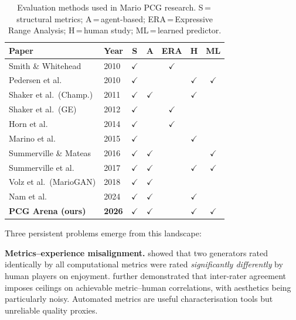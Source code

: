 \documentclass[shortabstract, mgr, english]{iithesis}
\begin{document}
\begin{table}[H]
\centering
\small
\begin{tabular}{llccccc}
\toprule
\textbf{Paper} & \textbf{Year} & \textbf{S} & \textbf{A} & \textbf{ERA} & \textbf{H} & \textbf{ML} \\
\midrule
Smith \& Whitehead          & 2010 & $\checkmark$ &              & $\checkmark$ &              &              \\
Pedersen et al.             & 2010 & $\checkmark$ &              &              & $\checkmark$ & $\checkmark$ \\
Shaker et al.\ (Champ.)     & 2011 & $\checkmark$ & $\checkmark$ &              & $\checkmark$ &              \\
Shaker et al.\ (GE)         & 2012 & $\checkmark$ &              & $\checkmark$ &              &              \\
Horn et al.                 & 2014 & $\checkmark$ &              & $\checkmark$ &              &              \\
Marino et al.               & 2015 & $\checkmark$ &              &              & $\checkmark$ &              \\
Summerville \& Mateas       & 2016 & $\checkmark$ & $\checkmark$ &              &              & $\checkmark$ \\
Summerville et al.          & 2017 & $\checkmark$ & $\checkmark$ &              & $\checkmark$ & $\checkmark$ \\
Volz et al.\ (MarioGAN)     & 2018 & $\checkmark$ & $\checkmark$ &              &              &              \\
Nam et al.                  & 2024 & $\checkmark$ & $\checkmark$ &              & $\checkmark$ &              \\
\midrule
\textbf{PCG Arena (ours)}   & \textbf{2026} & $\checkmark$ & $\checkmark$ & & $\checkmark$ & $\checkmark$ \\
\bottomrule
\end{tabular}
\caption{Evaluation methods used in Mario PCG research.
  S\,=\,structural metrics;
  A\,=\,agent-based;
  ERA\,=\,Expressive Range Analysis;
  H\,=\,human study;
  ML\,=\,learned predictor.}
\label{tab:eval-comparison}
\end{table}

Three persistent problems emerge from this landscape:

\textbf{Metrics--experience misalignment.} \citet{marino2015empirical} showed
that two generators rated identically by all computational metrics were rated
\emph{significantly differently} by human players on enjoyment.
\citet{summerville2017understanding} further demonstrated that inter-rater
agreement imposes ceilings on achievable metric--human correlations, with
aesthetics being particularly noisy. Automated metrics are useful
characterisation tools but unreliable quality proxies.
\end{document}
